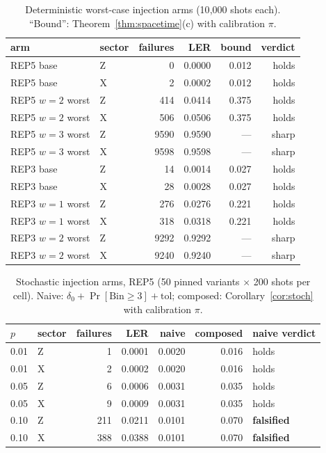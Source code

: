 \documentclass[11pt,a4paper]{article}
\begin{document}
\begin{table}[H]\centering\small
\caption{Deterministic worst-case injection arms (10{,}000 shots each).
``Bound'': Theorem~\ref{thm:spacetime}(c) with calibration $\pi$.}
\label{tab:injdet}
\begin{tabular}{@{}llrrrr@{}}
\toprule
arm & sector & failures & LER & bound & verdict \\\midrule
REP5 base & Z & 0 & 0.0000 & 0.012 & holds \\
REP5 base & X & 2 & 0.0002 & 0.012 & holds \\
REP5 $w{=}2$ worst & Z & 414 & 0.0414 & 0.375 & holds \\
REP5 $w{=}2$ worst & X & 506 & 0.0506 & 0.375 & holds \\
REP5 $w{=}3$ worst & Z & 9590 & 0.9590 & --- & sharp \\
REP5 $w{=}3$ worst & X & 9598 & 0.9598 & --- & sharp \\
REP3 base & Z & 14 & 0.0014 & 0.027 & holds \\
REP3 base & X & 28 & 0.0028 & 0.027 & holds \\
REP3 $w{=}1$ worst & Z & 276 & 0.0276 & 0.221 & holds \\
REP3 $w{=}1$ worst & X & 318 & 0.0318 & 0.221 & holds \\
REP3 $w{=}2$ worst & Z & 9292 & 0.9292 & --- & sharp \\
REP3 $w{=}2$ worst & X & 9240 & 0.9240 & --- & sharp \\\bottomrule
\end{tabular}
\end{table}

\begin{table}[H]\centering\small
\caption{Stochastic injection arms, REP5 (50 pinned variants $\times$ 200
shots per cell). Naive: $\delta_0+\Pr[\mathrm{Bin}\ge3]+\mathrm{tol}$;
composed: Corollary~\ref{cor:stoch} with calibration $\pi$.}
\label{tab:injstoch}
\begin{tabular}{@{}llrrrrl@{}}
\toprule
$p$ & sector & failures & LER & naive & composed & naive verdict \\\midrule
0.01 & Z & 1 & 0.0001 & 0.0020 & 0.016 & holds \\
0.01 & X & 2 & 0.0002 & 0.0020 & 0.016 & holds \\
0.05 & Z & 6 & 0.0006 & 0.0031 & 0.035 & holds \\
0.05 & X & 9 & 0.0009 & 0.0031 & 0.035 & holds \\
0.10 & Z & 211 & 0.0211 & 0.0101 & 0.070 & \textbf{falsified} \\
0.10 & X & 388 & 0.0388 & 0.0101 & 0.070 & \textbf{falsified} \\\bottomrule
\end{tabular}
\end{table}
\end{document}
